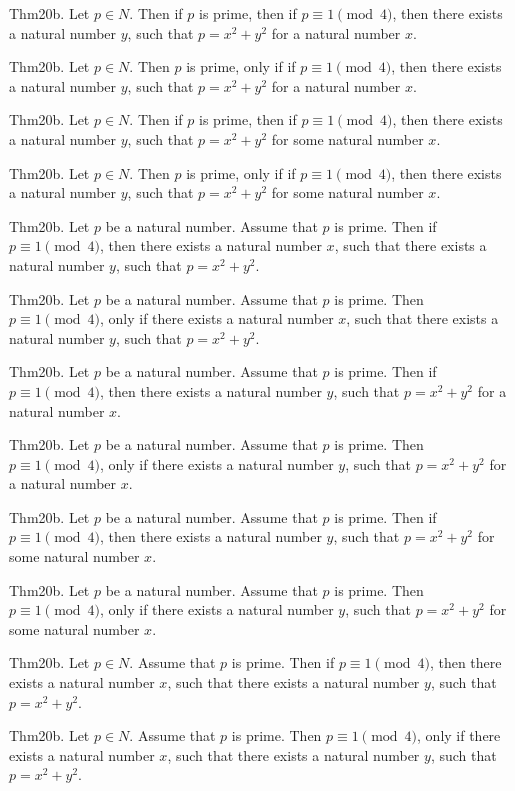 \documentclass{article}
\begin{document}
Thm20b. Let $p \in N$. Then if $p$ is prime, then if $p \equiv 1 \pmod{ 4}$, then there exists a natural number $y$, such that $p = x ^{ 2}+ y ^{ 2}$ for a natural number $x$.

Thm20b. Let $p \in N$. Then $p$ is prime, only if if $p \equiv 1 \pmod{ 4}$, then there exists a natural number $y$, such that $p = x ^{ 2}+ y ^{ 2}$ for a natural number $x$.

Thm20b. Let $p \in N$. Then if $p$ is prime, then if $p \equiv 1 \pmod{ 4}$, then there exists a natural number $y$, such that $p = x ^{ 2}+ y ^{ 2}$ for some natural number $x$.

Thm20b. Let $p \in N$. Then $p$ is prime, only if if $p \equiv 1 \pmod{ 4}$, then there exists a natural number $y$, such that $p = x ^{ 2}+ y ^{ 2}$ for some natural number $x$.

Thm20b. Let $p$ be a natural number. Assume that $p$ is prime. Then if $p \equiv 1 \pmod{ 4}$, then there exists a natural number $x$, such that there exists a natural number $y$, such that $p = x ^{ 2}+ y ^{ 2}$.

Thm20b. Let $p$ be a natural number. Assume that $p$ is prime. Then $p \equiv 1 \pmod{ 4}$, only if there exists a natural number $x$, such that there exists a natural number $y$, such that $p = x ^{ 2}+ y ^{ 2}$.

Thm20b. Let $p$ be a natural number. Assume that $p$ is prime. Then if $p \equiv 1 \pmod{ 4}$, then there exists a natural number $y$, such that $p = x ^{ 2}+ y ^{ 2}$ for a natural number $x$.

Thm20b. Let $p$ be a natural number. Assume that $p$ is prime. Then $p \equiv 1 \pmod{ 4}$, only if there exists a natural number $y$, such that $p = x ^{ 2}+ y ^{ 2}$ for a natural number $x$.

Thm20b. Let $p$ be a natural number. Assume that $p$ is prime. Then if $p \equiv 1 \pmod{ 4}$, then there exists a natural number $y$, such that $p = x ^{ 2}+ y ^{ 2}$ for some natural number $x$.

Thm20b. Let $p$ be a natural number. Assume that $p$ is prime. Then $p \equiv 1 \pmod{ 4}$, only if there exists a natural number $y$, such that $p = x ^{ 2}+ y ^{ 2}$ for some natural number $x$.

Thm20b. Let $p \in N$. Assume that $p$ is prime. Then if $p \equiv 1 \pmod{ 4}$, then there exists a natural number $x$, such that there exists a natural number $y$, such that $p = x ^{ 2}+ y ^{ 2}$.

Thm20b. Let $p \in N$. Assume that $p$ is prime. Then $p \equiv 1 \pmod{ 4}$, only if there exists a natural number $x$, such that there exists a natural number $y$, such that $p = x ^{ 2}+ y ^{ 2}$.
\end{document}
